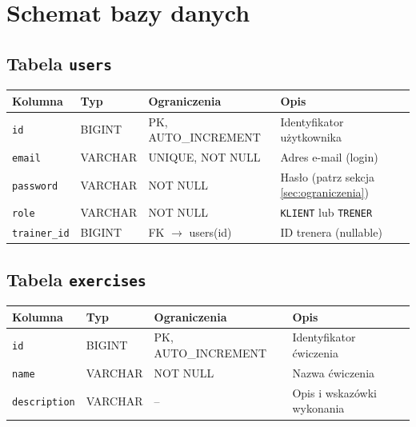 \documentclass[12pt,a4paper]{article}
\begin{document}
\section{Schemat bazy danych}

\subsection{Tabela \texttt{users}}

\begin{center}
\begin{tabular}{llll}
  \toprule
  \textbf{Kolumna} & \textbf{Typ} & \textbf{Ograniczenia} & \textbf{Opis} \\
  \midrule
  \texttt{id}          & BIGINT  & PK, AUTO\_INCREMENT     & Identyfikator użytkownika \\
  \texttt{email}       & VARCHAR & UNIQUE, NOT NULL        & Adres e-mail (login) \\
  \texttt{password}    & VARCHAR & NOT NULL                & Hasło (patrz sekcja \ref{sec:ograniczenia}) \\
  \texttt{role}        & VARCHAR & NOT NULL                & \texttt{KLIENT} lub \texttt{TRENER} \\
  \texttt{trainer\_id} & BIGINT  & FK $\rightarrow$ users(id) & ID trenera (nullable) \\
  \bottomrule
\end{tabular}
\end{center}
\newpage
\subsection{Tabela \texttt{exercises}}

\begin{center}
\begin{tabular}{llll}
  \toprule
  \textbf{Kolumna} & \textbf{Typ} & \textbf{Ograniczenia} & \textbf{Opis} \\
  \midrule
  \texttt{id}          & BIGINT  & PK, AUTO\_INCREMENT & Identyfikator ćwiczenia \\
  \texttt{name}        & VARCHAR & NOT NULL            & Nazwa ćwiczenia \\
  \texttt{description} & VARCHAR & --                  & Opis i wskazówki wykonania \\
  \bottomrule
\end{tabular}
\end{center}
\end{document}
